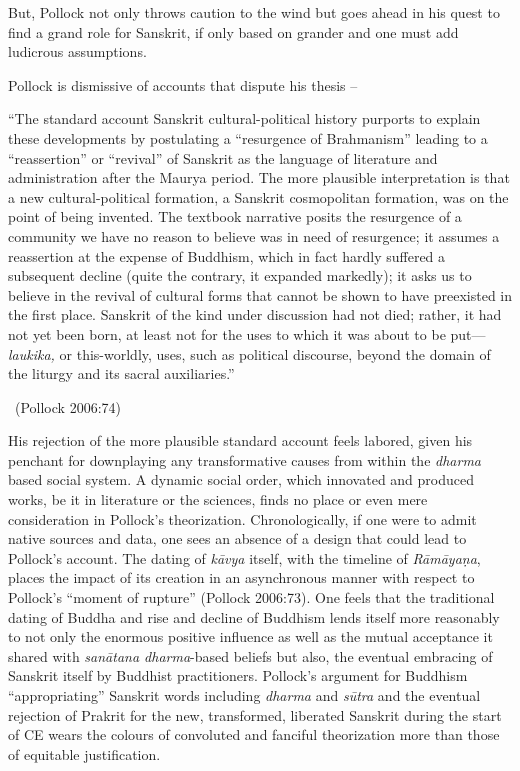 But, Pollock not only throws caution to the wind but goes ahead in his quest to find a grand role for Sanskrit, if only based on grander and one must add ludicrous assumptions.

Pollock is dismissive of accounts that dispute his thesis –

\begin{myquote}
“The standard account Sanskrit cultural-political history purports to explain these developments by postulating a “resurgence of Brahmanism” leading to a “reassertion” or “revival” of Sanskrit as the language of literature and administration after the Maurya period. The more plausible interpretation is that a new cultural-political formation, a Sanskrit cosmopolitan formation, was on the point of being invented. The textbook narrative posits the resurgence of a community we have no reason to believe was in need of resurgence; it assumes a reassertion at the expense of Buddhism, which in fact hardly suffered a subsequent decline (quite the contrary, it expanded markedly); it asks us to believe in the revival of cultural forms that cannot be shown to have preexisted in the first place. Sanskrit of the kind under discussion had not died; rather, it had not yet been born, at least not for the uses to which it was about to be put—\textit{laukika,} or this-worldly, uses, such as political discourse, beyond the domain of the liturgy and its sacral auxiliaries.” 

~\hfill (Pollock 2006:74)
\end{myquote}

His rejection of the more plausible standard account feels labored, given his penchant for downplaying any transformative causes from within the \textit{dharma} based social system. A dynamic social order, which innovated and produced works, be it in literature or the sciences, finds no place or even mere consideration in Pollock’s theorization. Chronologically, if one were to admit native sources and data, one sees an absence of a design that could lead to Pollock’s account. The dating of \textit{kāvya} itself, with the timeline of \textit{Rāmāyaṇa}, places the impact of its creation in an asynchronous manner with respect to Pollock’s “moment of rupture” (Pollock 2006:73). One feels that the traditional dating of Buddha and rise and decline of Buddhism lends itself more reasonably to not only the enormous positive influence as well as the mutual acceptance it shared with \textit{sanātana dharma}-based beliefs but also, the eventual embracing of Sanskrit itself by Buddhist practitioners. Pollock’s argument for Buddhism “appropriating” Sanskrit words including \textit{dharma} and \textit{sūtra} and the eventual rejection of Prakrit for the new, transformed, liberated Sanskrit during the start of CE wears the colours of convoluted and fanciful theorization more than those of equitable justification.

